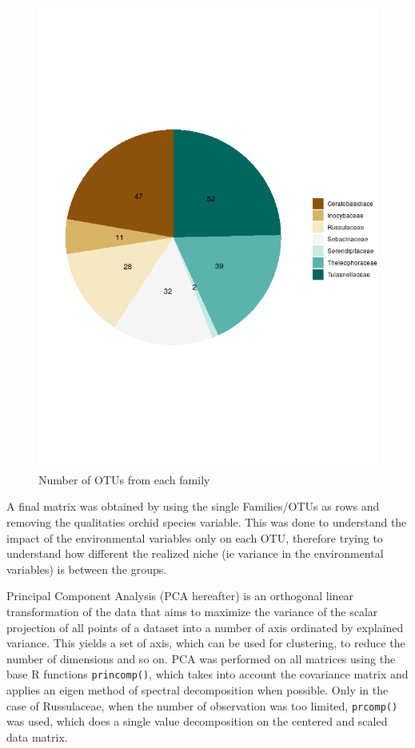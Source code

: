\begin{figure}[htbp]
\centering
\includegraphics[keepaspectratio,width=\textwidth,height=0.75\textheight]{images/clust.png}
\caption{Number of OTUs from each family}
\end{figure}

A final matrix was obtained by using the single Families\slash OTUs as rows and removing the qualitaties orchid species variable. This was done to understand the impact of the environmental variables only on each OTU, therefore trying to understand how different the realized niche (ie variance in the environmental variables) is between the groups.

Principal Component Analysis (PCA hereafter) is an orthogonal linear transformation of the data that aims to maximize the variance of the scalar projection of all points of a dataset into a number of axis ordinated by explained variance. This yields a set of axis, which can be used for clustering, to reduce the number of dimensions and so on. PCA was performed on all matrices using the base R functions \texttt{princomp()}, which takes into account the covariance matrix and applies an eigen method of spectral decomposition when possible. Only in the case of Russulaceae, when the number of observation was too limited, \texttt{prcomp()} was used, which does a single value decomposition on the centered and scaled data matrix.

